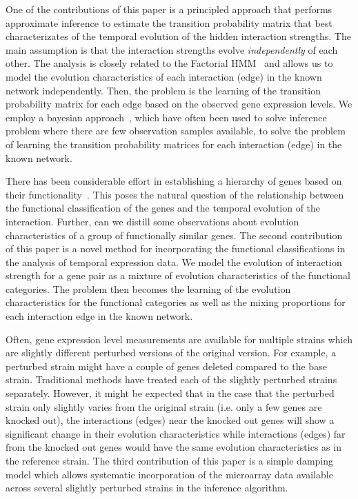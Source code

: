 \documentclass{bioinfo}
\begin{document}
One of the contributions of this paper is a principled approach that
performs approximate inference to estimate the transition probability
matrix that best characterizates of the temporal evolution of the hidden
interaction strengths. The main assumption is that the interaction
strengths evolve \emph{independently} of each other. The analysis is closely
related to the Factorial HMM~\citep{DBLP:journals/ml/GhahramaniJ97}
and allows us to model the evolution characteristics of each
interaction (edge) in the known network independently. Then, the
problem is the learning of the transition probability matrix for each
edge based on the observed gene expression levels. We employ a bayesian
approach~\citep{Gelman03bayesian,Beal03},  which have often been used to
solve inference problem where there are few observation samples
available, to solve the problem  of learning the transition
probability matrices for each interaction (edge) in the known network.

There has been considerable effort in establishing a
hierarchy of genes based on their 
functionality~\citep{Bader:2003:Nucleic-Acids-Res:12519993, MIPS,
  citeulike:814974, citeulike:226627, citeulike:3733950}. This poses 
the natural question of the relationship between the functional classification of
the genes and the temporal evolution of the interaction. Further, can
we distill some observations about evolution characteristics of a
group of functionally similar genes.  The second
contribution of this paper is a novel method for incorporating the
functional classifications in the analysis of temporal expression data. We
  model the evolution of interaction strength for a gene pair as a
  mixture of evolution characteristics of the functional
  categories. The problem then becomes the learning of the evolution
  characteristics for the functional categories as well as the mixing
  proportions for each interaction edge in the known network. 

Often, gene expression level measurements are available for multiple
strains which are slightly different perturbed versions of the
original version. For example, a perturbed strain might have a couple
of genes deleted compared to the base strain. Traditional methods have treated each of the
slightly perturbed strains separately. However, it might be expected
that in the case that the perturbed strain only slightly varies from
the original strain (i.e. only a few genes are knocked out), the
interactions (edges) near the knocked out genes will show a
significant change in their evolution characteristics 
while interactions (edges) far from the knocked out genes would have
the same evolution characteristics as in the reference strain. The
third contribution of this paper is a simple damping model which
allows systematic incorporation of the microarray data available across
several slightly perturbed strains in the inference algorithm. 
\end{document}
